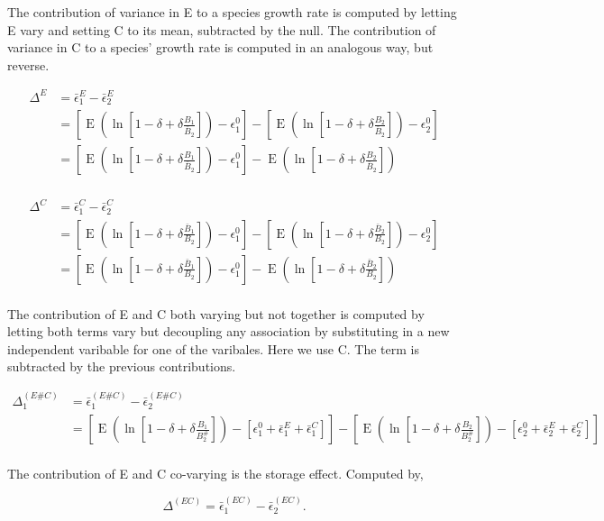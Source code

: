 \documentclass[letterpaper,11pt]{article}
\DeclareMathOperator{\EX}{E}%
\begin{document}
The contribution of variance in E to a species growth rate is computed by letting E vary and setting C to its mean, subtracted by the null. The contribution of variance in C to a species' growth rate is computed in an analogous way, but reverse.

\begin{align}
\Delta^E &= \bar \epsilon_1^E - \bar \epsilon_2^E\\
&=[\EX (\ln[1-\delta + \delta \frac{B_1}{\bar B_2}]) - \epsilon_1^0] - [\EX(\ln[1-\delta + \delta \frac{ B_2}{\bar B_2}]) - \epsilon_2^0]\\
&=[\EX (\ln[1-\delta + \delta \frac{B_1}{\bar B_2}]) - \epsilon_1^0] - \EX(\ln[1-\delta + \delta \frac{ B_2}{\bar B_2}]) \\
\end{align}

\begin{align}
\Delta^C &= \bar \epsilon_1^C - \bar \epsilon_2^C\\
&=[\EX (\ln[1-\delta + \delta \frac{\bar B_1}{B_2}]) - \epsilon_1^0] - [\EX(\ln[1-\delta + \delta \frac{\bar B_2}{B_2}]) - \epsilon_2^0]\\
&=[\EX (\ln[1-\delta + \delta \frac{\bar B_1}{B_2}]) - \epsilon_1^0] - \EX(\ln[1-\delta + \delta \frac{\bar B_2}{B_2}]) \\
\end{align}


The contribution of E and C both varying but not together is computed by letting both terms vary but decoupling any association by substituting in a new independent varibable for one of the varibales. Here we use C. The term is subtracted by the previous contributions.

\begin{align}
\Delta_1^{(E\#C)} &= \bar \epsilon_1^{(E\#C)} - \bar \epsilon_2^{(E\#C)}\\
&=[\EX(\ln[1-\delta + \delta \frac{B_1}{B_2^{\#}}]) -[\epsilon_1^0 +\bar \epsilon_1^E + \bar \epsilon_1^C]] - [\EX(\ln[1-\delta + \delta \frac{B_2}{B_2^{\#}}]) -[\epsilon_2^0 +\bar \epsilon_2^E + \bar \epsilon_2^C]]\\
\end{align}

The contribution of E and C co-varying is the storage effect. Computed by, 

\begin{equation}
\Delta^{(EC)} = \bar \epsilon_1^{(EC)} - \bar \epsilon_2^{(EC)}.
\end{equation}
\end{document}
